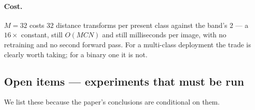 \documentclass[11pt]{article}
\theoremstyle{remark}
\begin{document}
\paragraph{Cost.} $M=32$ costs $32$ distance transforms per present class against the
band's $2$ --- a $16\times$ constant, still $O(MCN)$ and still milliseconds per image,
with no retraining and no second forward pass. For a multi-class deployment the
trade is clearly worth taking; for a binary one it is not.

\subsection{Open items --- experiments that must be run}\label{sec:openitems}

We list these because the paper's conclusions are conditional on them.
\end{document}
